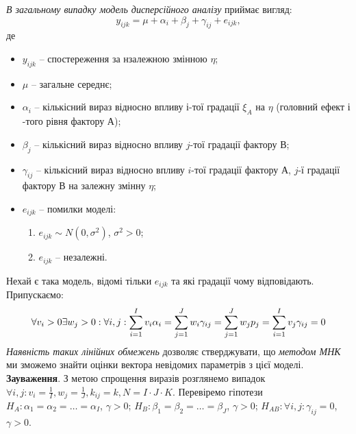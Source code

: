 \textit{В загальному випадку модель дисперсійного аналізу} приймає вигляд: \[ y_{ijk} = \mu + \alpha_i + \beta_j + \gamma_{ij} + e_{ijk}, \] де 
\begin{itemize}
	\item $y_{ijk}$ -- спостереження за нзалежною змінною $\eta$;
	\item $\mu$ -- загальне середнє;
	\item $\alpha_i$ -- кількісний вираз відносно впливу $і$-тої градації $\xi_A$ на $\eta$ (головний ефект $і$-того рівня фактору $А$); 
	\item $\beta_j$ -- кількісний вираз відносно впливу $j$-тої градації фактору $В$;
	\item $\gamma_{ij}$ -- кількісний вираз відносно впливу $i$-тої градації фактору $А$, $j$-ї градації фактору $В$ на залежну змінну $\eta$;
	\item $e_{ijk}$ -- помилки моделі:
	\begin{enumerate}
		\item $e_{ijk} \sim N(0, \sigma^2)$, $\sigma^2>0$;
		\item $e_{ijk}$ -- незалежні.
	\end{enumerate}
\end{itemize}
Нехай є така модель, відомі тільки $e_{ijk}$ та які градації чому відповідають. \\

Припускаємо: \[ \forall v_i>0 \exists w_j>0: \forall i,j: \displaystyle\sum\limits_{i=1}^I v_i\alpha_i=\displaystyle\sum\limits_{j=1}^J w_i\gamma_{ij} = \displaystyle\sum\limits_{j=1}^J w_jp_j = \displaystyle\sum\limits_{i=1}^I v_j\gamma_{ij}=0 \]
\textit{Наявність таких лінійних обмежень} дозволяє стверджувати, що \textit{методом МНК} ми зможемо знайти оцінки вектора невідомих параметрів з цієї моделі. \\

\textbf{Зауваження}. З метою спрощення виразів розглянемо випадок $\forall i,j: v_i = \frac{1}{I}, w_j = \frac{1}{J}, k_{ij}=k, N = I \cdot J \cdot K$. Перевіремо гіпотези $H_A: \alpha_1 = \alpha_2 = \ldots = \alpha_I$, $\gamma > 0$; $H_B: \beta_1 = \beta_2 = \ldots = \beta_J$, $\gamma > 0$; $H_{AB}: \forall i,j: \gamma_{ij} = 0$, $\gamma > 0$. \\

